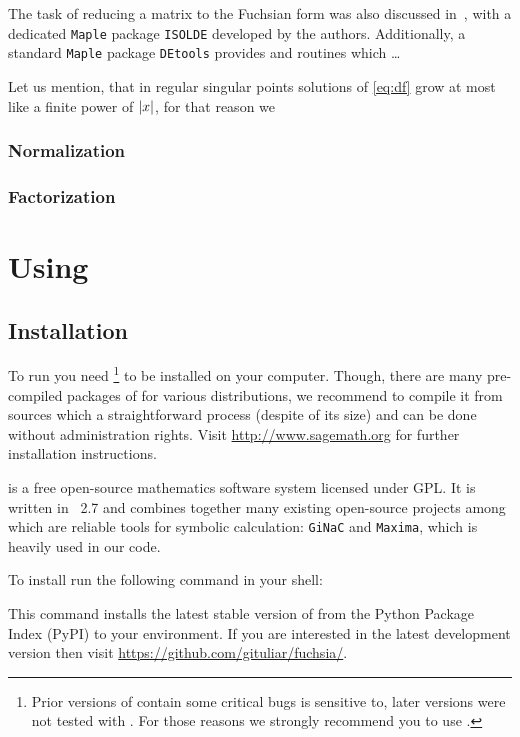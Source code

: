 \documentclass[12pt,a4paper]{article}
\begin{document}
The task of reducing a matrix to the Fuchsian form was also discussed in~\cite{BP99}, with a dedicated \texttt{Maple} package \texttt{ISOLDE} developed by the authors.
Additionally, a standard \texttt{Maple} package \texttt{DEtools} provides  and  routines which \ldots

Let us mention, that in regular singular points solutions of \eqref{eq:df} grow at most like a finite power of $\left|x\right|$, for that reason we 

\subsubsection{Normalization}

\subsubsection{Factorization}


\section{Using \fuchsia}
\label{sec:3}

\subsection{Installation}

To run \fuchsia you need \footnote{Prior versions of \sage contain some critical bugs \fuchsia is sensitive to, later versions were not tested with \fuchsia.
For those reasons we strongly recommend you to use .} to be installed on your computer.
Though, there are many pre-compiled packages of \sage for various \linux distributions, we recommend to compile it from sources which a straightforward process (despite of its size) and can be done without administration rights.
Visit \url{http://www.sagemath.org} for further installation instructions.

\sage is a free open-source mathematics software system licensed under GPL.
It is written in \python~2.7 and combines together many existing open-source projects among which are reliable tools for symbolic calculation: \texttt{GiNaC} and \texttt{Maxima}, which is heavily used in our code.

To install \fuchsia run the following command in your shell:


This command installs the latest stable version of \fuchsia from the Python Package Index (PyPI) to your \sage environment.
If you are interested in the latest development version then visit \url{https://github.com/gituliar/fuchsia/}.
\end{document}
